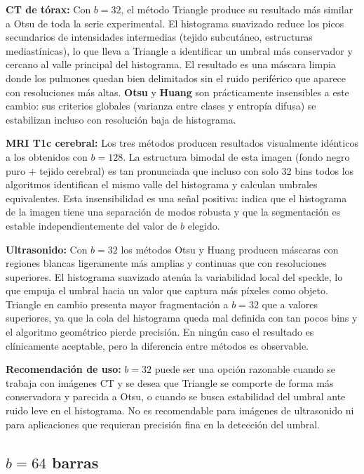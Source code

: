 \documentclass[12pt, a4paper]{article}
\begin{document}
\textbf{CT de tórax:} Con $b = 32$, el método Triangle produce su resultado más similar
a Otsu de toda la serie experimental. El histograma suavizado reduce los picos secundarios
de intensidades intermedias (tejido subcutáneo, estructuras mediastínicas), lo que lleva
a Triangle a identificar un umbral más conservador y cercano al valle principal del
histograma. El resultado es una máscara limpia donde los pulmones quedan bien delimitados
sin el ruido periférico que aparece con resoluciones más altas. \textbf{Otsu} y
\textbf{Huang} son prácticamente insensibles a este cambio: sus criterios globales (varianza
entre clases y entropía difusa) se estabilizan incluso con resolución baja de histograma.

\textbf{MRI T1c cerebral:} Los tres métodos producen resultados visualmente idénticos a
los obtenidos con $b = 128$. La estructura bimodal de esta imagen (fondo negro puro +
tejido cerebral) es tan pronunciada que incluso con solo 32 bins todos los algoritmos
identifican el mismo valle del histograma y calculan umbrales equivalentes. Esta
insensibilidad es una señal positiva: indica que el histograma de la imagen tiene una
separación de modos robusta y que la segmentación es estable independientemente del valor
de $b$ elegido.

\textbf{Ultrasonido:} Con $b = 32$ los métodos Otsu y Huang producen máscaras con regiones
blancas ligeramente más amplias y continuas que con resoluciones superiores. El histograma
suavizado atenúa la variabilidad local del speckle, lo que empuja el umbral hacia un valor
que captura más píxeles como objeto. Triangle en cambio presenta mayor fragmentación a
$b = 32$ que a valores superiores, ya que la cola del histograma queda mal definida con
tan pocos bins y el algoritmo geométrico pierde precisión. En ningún caso el resultado
es clínicamente aceptable, pero la diferencia entre métodos es observable.

\textbf{Recomendación de uso:} $b = 32$ puede ser una opción razonable cuando se trabaja
con imágenes CT y se desea que Triangle se comporte de forma más conservadora y parecida
a Otsu, o cuando se busca estabilidad del umbral ante ruido leve en el histograma.
No es recomendable para imágenes de ultrasonido ni para aplicaciones que requieran
precisión fina en la detección del umbral.

\subsection{$b = 64$ barras}
\end{document}
